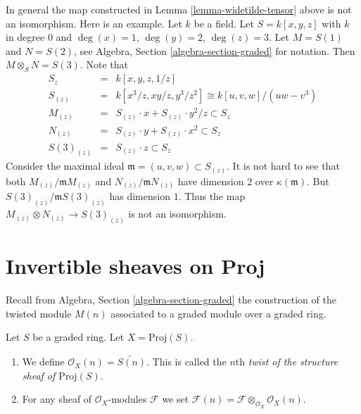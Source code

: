 \begin{remark}
\label{remark-not-isomorphism}
In general the map constructed in Lemma \ref{lemma-widetilde-tensor}
above is not an isomorphism. Here is an example. Let $k$
be a field. Let $S = k[x, y, z]$ with $k$ in degree $0$ and
$\deg(x) = 1$, $\deg(y) = 2$, $\deg(z) = 3$.
Let $M = S(1)$ and $N = S(2)$, see
Algebra, Section \ref{algebra-section-graded}
for notation. Then $M \otimes_S N = S(3)$.
Note that
\begin{eqnarray*}
S_z
& = &
k[x, y, z, 1/z] \\
S_{(z)}
& = &
k[x^3/z, xy/z, y^3/z^2]
\cong
k[u, v, w]/(uw - v^3) \\
M_{(z)} & = & S_{(z)} \cdot x + S_{(z)} \cdot y^2/z \subset S_z \\
N_{(z)} & = & S_{(z)} \cdot y + S_{(z)} \cdot x^2 \subset S_z \\
S(3)_{(z)} & = & S_{(z)} \cdot z \subset S_z
\end{eqnarray*}
Consider the maximal ideal $\mathfrak m = (u, v, w) \subset S_{(z)}$.
It is not hard to see that both $M_{(z)}/\mathfrak mM_{(z)}$
and $N_{(z)}/\mathfrak mN_{(z)}$ have dimension $2$ over
$\kappa(\mathfrak m)$. But
$S(3)_{(z)}/\mathfrak mS(3)_{(z)}$ has dimension $1$.
Thus the map $M_{(z)} \otimes N_{(z)} \to S(3)_{(z)}$ is not
an isomorphism.
\end{remark}









\section{Invertible sheaves on Proj}
\label{section-invertible-on-proj}

\noindent
Recall from Algebra, Section \ref{algebra-section-graded}
the construction of the twisted module $M(n)$ associated
to a graded module over a graded ring.

\begin{definition}
\label{definition-twist}
Let $S$ be a graded ring. Let $X = \text{Proj}(S)$.
\begin{enumerate}
\item We define $\mathcal{O}_X(n) = \widetilde{S(n)}$.
This is called the $n$th
{\it twist of the structure sheaf of $\text{Proj}(S)$}.
\item For any sheaf of $\mathcal{O}_X$-modules $\mathcal{F}$ we set
$\mathcal{F}(n) = \mathcal{F} \otimes_{\mathcal{O}_X} \mathcal{O}_X(n)$.
\end{enumerate}
\end{definition}

